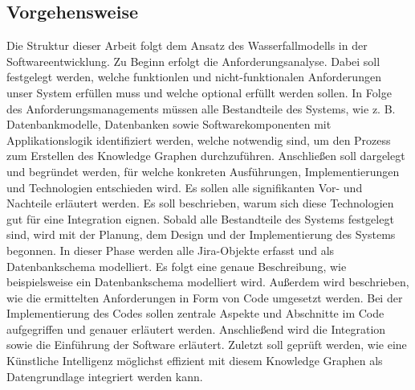 \subsection{Vorgehensweise}
Die Struktur dieser Arbeit folgt dem Ansatz des Wasserfallmodells in der Softwareentwicklung. Zu Beginn erfolgt die Anforderungsanalyse. Dabei soll festgelegt werden, welche funktionlen und nicht-funktionalen Anforderungen unser System erfüllen muss und welche optional erfüllt werden sollen. In Folge des Anforderungsmanagements müssen alle Bestandteile des Systems, wie z. B. Datenbankmodelle, Datenbanken sowie Softwarekomponenten mit Applikationslogik identifiziert werden, welche notwendig sind, um den Prozess zum Erstellen des Knowledge Graphen durchzuführen. Anschließen soll dargelegt und begründet werden, für welche konkreten Ausführungen, Implementierungen und Technologien entschieden wird. Es sollen alle signifikanten Vor- und Nachteile erläutert werden. Es soll beschrieben, warum sich diese Technologien gut für eine Integration eignen. Sobald alle Bestandteile des Systems festgelegt sind, wird mit der Planung, dem Design und der Implementierung des Systems begonnen. In dieser Phase werden alle Jira-Objekte erfasst und als Datenbankschema modelliert. Es folgt eine genaue Beschreibung, wie beispielsweise ein Datenbankschema modelliert wird. Außerdem wird beschrieben, wie die ermittelten Anforderungen in Form von Code umgesetzt werden. Bei der Implementierung des Codes sollen zentrale Aspekte und Abschnitte im Code aufgegriffen und genauer erläutert werden. Anschließend wird die Integration sowie die Einführung der Software erläutert. Zuletzt soll geprüft werden, wie eine Künstliche Intelligenz möglichst effizient mit diesem Knowledge Graphen als Datengrundlage integriert werden kann.\\